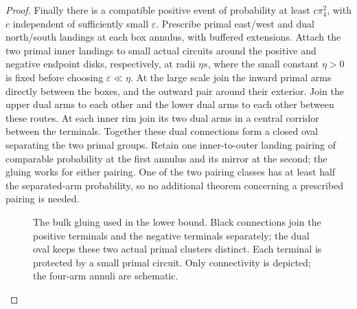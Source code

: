 \begin{proof}
Finally there is a compatible positive event of probability at least
$c\pi_4^2$, with $c$ independent of sufficiently small $\varepsilon$.
Prescribe primal east/west and dual north/south landings
at each box annulus, with buffered extensions.  Attach the two primal
inner landings to small actual circuits around the positive and
negative endpoint disks, respectively, at radii $\eta s$,
where the small constant $\eta>0$ is fixed before choosing
$\varepsilon\ll\eta$.  At the large scale join the inward primal arms
directly between the boxes, and the outward pair around their
exterior.  Join the upper dual arms to each other and the lower dual
arms to each other between these routes.  At each inner rim join its
two dual arms in a central corridor between the terminals.  Together
these dual connections form a closed oval separating the two primal
groups.  Retain one inner-to-outer landing pairing of comparable
probability at the first annulus and its mirror at the second; the
gluing works for either pairing.  One of the two pairing classes
has at least half the separated-arm probability, so no additional
theorem concerning a prescribed pairing is needed.

\begin{figure}[tbp]
\centering
{}
\caption{The bulk gluing used in the lower bound.  Black connections
join the positive terminals and the negative terminals separately;
the dual oval keeps these two actual primal clusters distinct.
Each terminal is protected by a small primal circuit.  Only
connectivity is depicted; the four-arm annuli are schematic.}
\label{q4field:gluing-figure}
\end{figure}


\end{proof}
